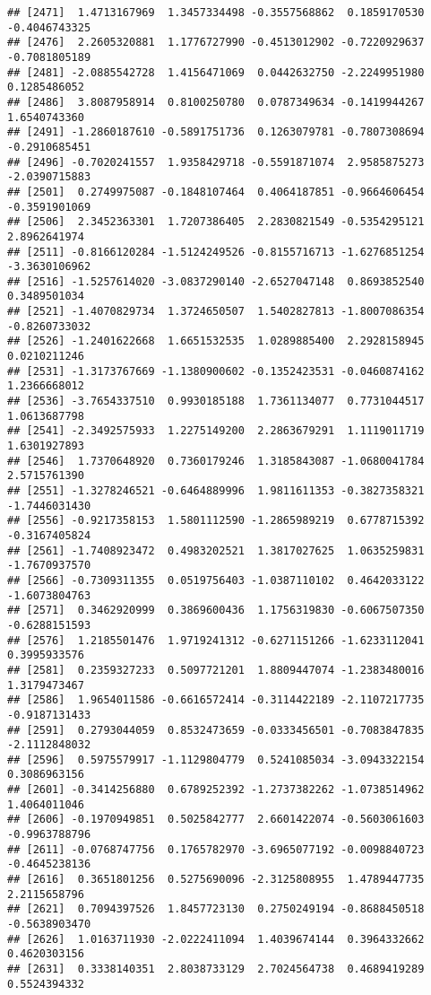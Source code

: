 \documentclass[
]{article}
\begin{document}
\begin{verbatim}
## [2471]  1.4713167969  1.3457334498 -0.3557568862  0.1859170530 -0.4046743325
## [2476]  2.2605320881  1.1776727990 -0.4513012902 -0.7220929637 -0.7081805189
## [2481] -2.0885542728  1.4156471069  0.0442632750 -2.2249951980  0.1285486052
## [2486]  3.8087958914  0.8100250780  0.0787349634 -0.1419944267  1.6540743360
## [2491] -1.2860187610 -0.5891751736  0.1263079781 -0.7807308694 -0.2910685451
## [2496] -0.7020241557  1.9358429718 -0.5591871074  2.9585875273 -2.0390715883
## [2501]  0.2749975087 -0.1848107464  0.4064187851 -0.9664606454 -0.3591901069
## [2506]  2.3452363301  1.7207386405  2.2830821549 -0.5354295121  2.8962641974
## [2511] -0.8166120284 -1.5124249526 -0.8155716713 -1.6276851254 -3.3630106962
## [2516] -1.5257614020 -3.0837290140 -2.6527047148  0.8693852540  0.3489501034
## [2521] -1.4070829734  1.3724650507  1.5402827813 -1.8007086354 -0.8260733032
## [2526] -1.2401622668  1.6651532535  1.0289885400  2.2928158945  0.0210211246
## [2531] -1.3173767669 -1.1380900602 -0.1352423531 -0.0460874162  1.2366668012
## [2536] -3.7654337510  0.9930185188  1.7361134077  0.7731044517  1.0613687798
## [2541] -2.3492575933  1.2275149200  2.2863679291  1.1119011719  1.6301927893
## [2546]  1.7370648920  0.7360179246  1.3185843087 -1.0680041784  2.5715761390
## [2551] -1.3278246521 -0.6464889996  1.9811611353 -0.3827358321 -1.7446031430
## [2556] -0.9217358153  1.5801112590 -1.2865989219  0.6778715392 -0.3167405824
## [2561] -1.7408923472  0.4983202521  1.3817027625  1.0635259831 -1.7670937570
## [2566] -0.7309311355  0.0519756403 -1.0387110102  0.4642033122 -1.6073804763
## [2571]  0.3462920999  0.3869600436  1.1756319830 -0.6067507350 -0.6288151593
## [2576]  1.2185501476  1.9719241312 -0.6271151266 -1.6233112041  0.3995933576
## [2581]  0.2359327233  0.5097721201  1.8809447074 -1.2383480016  1.3179473467
## [2586]  1.9654011586 -0.6616572414 -0.3114422189 -2.1107217735 -0.9187131433
## [2591]  0.2793044059  0.8532473659 -0.0333456501 -0.7083847835 -2.1112848032
## [2596]  0.5975579917 -1.1129804779  0.5241085034 -3.0943322154  0.3086963156
## [2601] -0.3414256880  0.6789252392 -1.2737382262 -1.0738514962  1.4064011046
## [2606] -0.1970949851  0.5025842777  2.6601422074 -0.5603061603 -0.9963788796
## [2611] -0.0768747756  0.1765782970 -3.6965077192 -0.0098840723 -0.4645238136
## [2616]  0.3651801256  0.5275690096 -2.3125808955  1.4789447735  2.2115658796
## [2621]  0.7094397526  1.8457723130  0.2750249194 -0.8688450518 -0.5638903470
## [2626]  1.0163711930 -2.0222411094  1.4039674144  0.3964332662  0.4620303156
## [2631]  0.3338140351  2.8038733129  2.7024564738  0.4689419289  0.5524394332

\end{verbatim}
\end{document}
